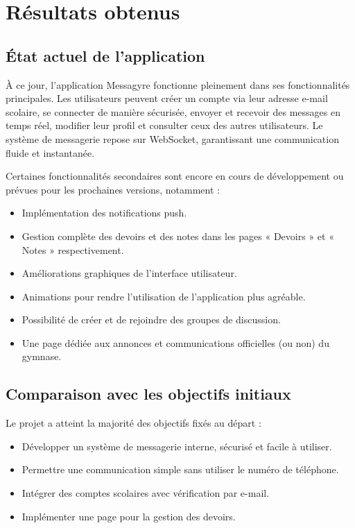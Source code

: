\documentclass[12pt]{report}
\begin{document}
\chapter{Résultats obtenus}

\section{État actuel de l'application}

À ce jour, l'application Messagyre fonctionne pleinement dans ses fonctionnalités principales. Les utilisateurs peuvent créer un compte via leur adresse e-mail scolaire, se connecter de manière sécurisée, envoyer et recevoir des messages en temps réel, modifier leur profil et consulter ceux des autres utilisateurs. Le système de messagerie repose sur WebSocket, garantissant une communication fluide et instantanée.

Certaines fonctionnalités secondaires sont encore en cours de développement ou prévues pour les prochaines versions, notamment :

\begin{itemize}
	\item Implémentation des notifications push.
	\item Gestion complète des devoirs et des notes dans les pages « Devoirs » et « Notes » respectivement.
	\item Améliorations graphiques de l’interface utilisateur.
	\item Animations pour rendre l’utilisation de l’application plus agréable.
	\item Possibilité de créer et de rejoindre des groupes de discussion.
	\item Une page dédiée aux annonces et communications officielles (ou non) du gymnase.
\end{itemize}

\section{Comparaison avec les objectifs initiaux}

Le projet a atteint la majorité des objectifs fixés au départ :

\begin{itemize}
	\item Développer un système de messagerie interne, sécurisé et facile à utiliser.
	\item Permettre une communication simple sans utiliser le numéro de téléphone.
	\item Intégrer des comptes scolaires avec vérification par e-mail.
	\item Implémenter une page pour la gestion des devoirs.
\end{itemize}
\end{document}
